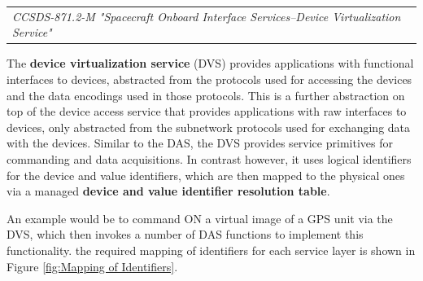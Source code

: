 \begin{tabular}{l}
\textit{CCSDS-871.2-M "Spacecraft Onboard Interface Services--Device Virtualization Service" \cite{CCSDS-871.2-M}} 
\end{tabular}

The \textbf{device virtualization service} (DVS) provides applications with functional interfaces to devices, abstracted from the protocols used for accessing the devices and the data encodings used in those protocols. This is a further abstraction on top of the device access service that provides applications with raw interfaces to devices, only abstracted from the subnetwork protocols used for exchanging data with the devices. Similar to the DAS, the DVS provides service primitives for commanding and data acquisitions. In contrast however, it uses logical identifiers for the device and value identifiers, which are then mapped to the physical ones via a managed \textbf{device and value identifier resolution table}.

An example would be to command ON a virtual image of a GPS unit via the DVS, which then invokes a number of DAS functions to implement this functionality. the required mapping of identifiers for each service layer is shown in Figure \ref{fig:Mapping of Identifiers}.

